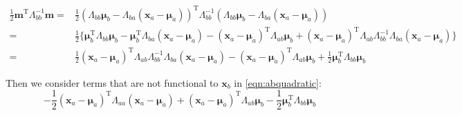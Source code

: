 \begin{equation}
\begin{split}
\frac{1}{2}\mathbf{m}^{\mathrm{T}}\Lambda_{bb}^{-1}\mathbf{m}=&\frac{1}{2}(\Lambda_{bb}\boldsymbol{\mu}_{b}-\Lambda_{ba}(\mathbf{x}_{a}-\boldsymbol{\mu}_{a}))^{\mathrm{T}}\Lambda_{bb}^{-1}(\Lambda_{bb}\boldsymbol{\mu}_{b}-\Lambda_{ba}(\mathbf{x}_{a}-\boldsymbol{\mu}_{a}))\\
=&\frac{1}{2}\{\boldsymbol{\mu}_{b}^{\mathrm{T}}\Lambda_{bb}\boldsymbol{\mu}_{b}-\boldsymbol{\mu}_{b}^{\mathrm{T}}\Lambda_{ba}(\mathbf{x}_{a}-\boldsymbol{\mu}_{a})-(\mathbf{x}_{a}-\boldsymbol{\mu}_{a})^{\mathrm{T}}\Lambda_{ab}\boldsymbol{\mu}_{b}+(\mathbf{x}_{a}-\boldsymbol{\mu}_{a})^{\mathrm{T}}\Lambda_{ab}\Lambda_{bb}^{-1}\Lambda_{ba}(\mathbf{x}_{a}-\boldsymbol{\mu}_{a})\}\\
=&\frac{1}{2}(\mathbf{x}_{a}-\boldsymbol{\mu}_{a})^{\mathrm{T}}\Lambda_{ab}\Lambda_{bb}^{-1}\Lambda_{ba}(\mathbf{x}_{a}-\boldsymbol{\mu}_{a})-(\mathbf{x}_{a}-\boldsymbol{\mu}_{a})^{\mathrm{T}}\Lambda_{ab}\boldsymbol{\mu}_{b}+\frac{1}{2}\boldsymbol{\mu}_{b}^{\mathrm{T}}\Lambda_{bb}\boldsymbol{\mu}_{b}
\end{split}
\label{eqn:rmm}
\end{equation}


Then we consider terms that are not functional to $\mathbf{x}_b$ in
\eqref{eqn:abquadratic}:
\begin{equation}
-\frac{1}{2}(\mathbf{x}_{a}-\boldsymbol{\mu}_{a})^{\mathrm{T}}\Lambda_{aa}(\mathbf{x}_{a}-\boldsymbol{\mu}_{a})+(\mathbf{x}_{a}-\boldsymbol{\mu}_{a})^{\mathrm{T}}\Lambda_{ab}\boldsymbol{\mu}_{b}-\frac{1}{2}\boldsymbol{\mu}_{b}^{\mathrm{T}}\Lambda_{bb}\boldsymbol{\mu}_{b}
\label{eqn:hn2dwb}
\end{equation}



